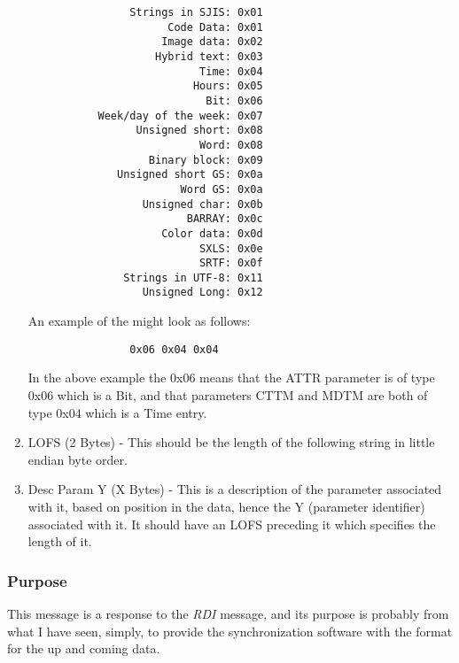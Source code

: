 \begin{enumerate}
              \begin{verbatim}
                Strings in SJIS: 0x01
                      Code Data: 0x01
                     Image data: 0x02
                    Hybrid text: 0x03
                           Time: 0x04
                          Hours: 0x05
                            Bit: 0x06
           Week/day of the week: 0x07
                 Unsigned short: 0x08
                           Word: 0x08
                   Binary block: 0x09
              Unsigned short GS: 0x0a
                        Word GS: 0x0a
                  Unsigned char: 0x0b
                         BARRAY: 0x0c
                     Color data: 0x0d
                           SXLS: 0x0e
                           SRTF: 0x0f
               Strings in UTF-8: 0x11
                  Unsigned Long: 0x12
              \end{verbatim}

              An example of the might look as follows:

              \begin{verbatim}
                0x06 0x04 0x04
              \end{verbatim}

              In the above example the 0x06 means that the ATTR parameter is
              of type 0x06 which is a Bit, and that parameters CTTM and MDTM
              are both of type 0x04 which is a Time entry.

              \item LOFS (2 Bytes) - This should be the length of the
              following string in little endian byte order.

              \item Desc Param Y (X Bytes) - This is a description of the
              parameter associated with it, based on position in the data,
              hence the Y (parameter identifier) associated with it. It should
              have an LOFS preceding it which specifies the length of it.

            \end{enumerate}

            \subsubsection{Purpose}

            This message is a response to the \emph{RDI} message, and its
            purpose is probably from what I have seen, simply, to provide the
            synchronization software with the format for the up and coming
            data.


